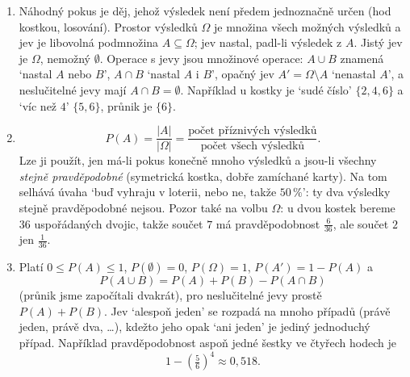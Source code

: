 \begin{enumerate}[label=\textbf{\arabic*.}, leftmargin=*, itemsep=0.8em]
  \item {}
  Náhodný pokus je děj, jehož výsledek není předem jednoznačně určen (hod kostkou, losování). Prostor výsledků $\Omega$ je množina všech možných výsledků a jev je libovolná podmnožina $A\subseteq\Omega$; jev nastal, padl-li výsledek z $A$. Jistý jev je $\Omega$, nemožný $\emptyset$. Operace s jevy jsou množinové operace: $A\cup B$ znamená `nastal $A$ nebo $B$', $A\cap B$ `nastal $A$ i $B$', opačný jev $A' = \Omega\setminus A$ `nenastal $A$', a neslučitelné jevy mají $A\cap B = \emptyset$. Například u kostky je `sudé číslo' $\{2, 4, 6\}$ a `víc než $4$' $\{5, 6\}$, průnik je $\{6\}$. 

  \item {}
  \begin{equation*}
    P(A) = \frac{|A|}{|\Omega|} = \frac{\text{počet příznivých výsledků}}{\text{počet všech výsledků}}.
  \end{equation*}
  Lze ji použít, jen má-li pokus konečně mnoho výsledků a jsou-li všechny \emph{stejně pravděpodobné} (symetrická kostka, dobře zamíchané karty). Na tom selhává úvaha `buď vyhraju v loterii, nebo ne, takže $50\,\%$': ty dva výsledky stejně pravděpodobné nejsou. Pozor také na volbu $\Omega$: u dvou kostek bereme $36$ uspořádaných dvojic, takže součet $7$ má pravděpodobnost $\frac{6}{36}$, ale součet $2$ jen $\frac{1}{36}$. 

  \item {}
  Platí $0\leq P(A)\leq 1$, $P(\emptyset) = 0$, $P(\Omega) = 1$, $P(A') = 1 - P(A)$ a
  \begin{equation*}
    P(A\cup B) = P(A) + P(B) - P(A\cap B)
  \end{equation*}
  (průnik jsme započítali dvakrát), pro neslučitelné jevy prostě $P(A) + P(B)$. Jev `alespoň jeden' se rozpadá na mnoho případů (právě jeden, právě dva, \ldots), kdežto jeho opak `ani jeden' je jediný jednoduchý případ. Například pravděpodobnost aspoň jedné šestky ve čtyřech hodech je
  \begin{equation*}
    1 - {\left(\tfrac{5}{6}\right)}^4\approx 0{,}518.
  \end{equation*}


\end{enumerate}
